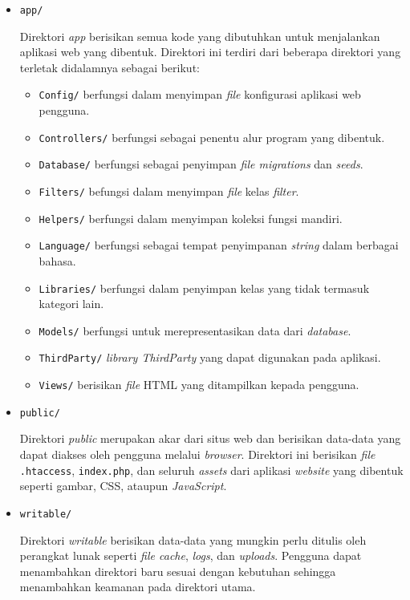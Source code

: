 \begin{itemize}
\item \texttt{app/}

Direktori \textit{app} berisikan semua kode yang dibutuhkan untuk menjalankan aplikasi web yang dibentuk. Direktori ini terdiri dari beberapa direktori yang terletak didalamnya sebagai berikut:
\begin{itemize}
\item \verb|Config/| berfungsi dalam menyimpan \textit{file} konfigurasi aplikasi web pengguna.
\item \verb|Controllers/| berfungsi sebagai penentu alur program yang dibentuk.
\item \verb|Database/| berfungsi sebagai penyimpan \textit{file migrations} dan \textit{seeds}.
\item \verb|Filters/| befungsi dalam menyimpan \textit{file} kelas \textit{filter}.
\item \verb|Helpers/| berfungsi dalam menyimpan koleksi fungsi mandiri.
\item \verb|Language/| berfungsi sebagai tempat penyimpanan \textit{string} dalam berbagai bahasa.
\item \verb|Libraries/| berfungsi dalam penyimpan kelas yang tidak termasuk kategori lain.
\item \verb|Models/| berfungsi untuk merepresentasikan data dari \textit{database}.
\item \verb|ThirdParty/| \textit{library ThirdParty} yang dapat digunakan pada aplikasi.
\item \verb|Views/| berisikan \textit{file} HTML yang ditampilkan kepada pengguna.
\end{itemize}

\item \texttt{public/}

Direktori \textit{public} merupakan akar dari situs web dan berisikan data-data yang dapat diakses oleh pengguna melalui \textit{browser}. Direktori ini berisikan \textit{file} \verb|.htaccess|, \verb|index.php|, dan seluruh \textit{assets} dari aplikasi \textit{website} yang dibentuk seperti gambar, CSS, ataupun \textit{JavaScript}.

\item \texttt{writable/}

Direktori \textit{writable} berisikan data-data yang mungkin perlu ditulis oleh perangkat lunak seperti \textit{file cache}, \textit{logs}, dan \textit{uploads}. Pengguna dapat menambahkan direktori baru sesuai dengan kebutuhan sehingga menambahkan keamanan pada direktori utama.


\end{itemize}
